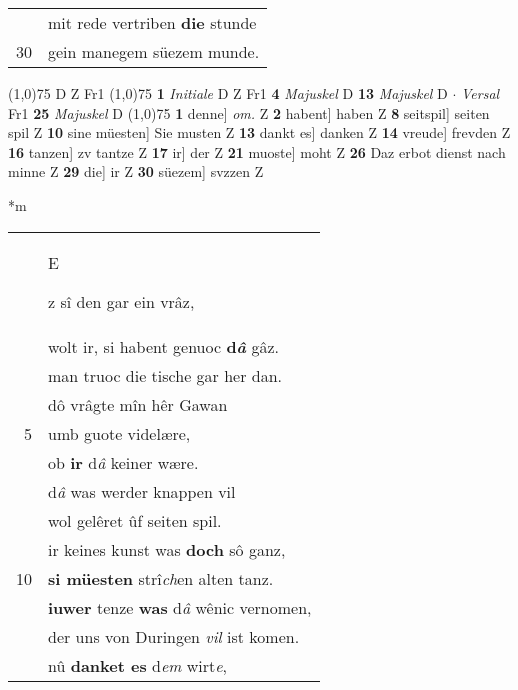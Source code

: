 \documentclass[8pt,a4paper,notitlepage]{article}
\begin{document}
\begin{table}[ht]
\begin{minipage}[t]{0.5\linewidth}
\begin{tabular}{rl}
 & mit rede vertriben \textbf{die} stunde\\ 
30 & gein manegem süezem munde.\\ 
\end{tabular}
\scriptsize
\line(1,0){75} \newline
D Z Fr1 \newline
\line(1,0){75} \newline
\textbf{1} \textit{Initiale} D Z Fr1  \textbf{4} \textit{Majuskel} D  \textbf{13} \textit{Majuskel} D   $\cdot$ \textit{Versal} Fr1  \textbf{25} \textit{Majuskel} D  \newline
\line(1,0){75} \newline
\textbf{1} denne] \textit{om.} Z \textbf{2} habent] haben Z \textbf{8} seitspil] seiten spil Z \textbf{10} sine müesten] Sie musten Z \textbf{13} dankt es] danken Z \textbf{14} vreude] frevden Z \textbf{16} tanzen] zv tantze Z \textbf{17} ir] der Z \textbf{21} muoste] moht Z \textbf{26} Daz erbot dienst nach minne Z \textbf{29} die] ir Z \textbf{30} süezem] svzzen Z \newline
\end{minipage}
\hspace{0.5cm}
\begin{minipage}[t]{0.5\linewidth}
\small
\begin{center}*m
\end{center}
\begin{tabular}{rl}
 & \begin{large}E\end{large}z sî den gar ein vrâz,\\ 
 & wolt ir, si habent genuoc \textbf{d\textit{â}} gâz.\\ 
 & man truoc die tische gar her dan.\\ 
 & dô vrâgte mîn hêr Gawan\\ 
5 & umb guote videlære,\\ 
 & ob \textbf{ir} d\textit{â} keiner wære.\\ 
 & d\textit{â} was werder knappen vil\\ 
 & wol gelêret ûf seiten spil.\\ 
 & ir keines kunst was \textbf{doch} sô ganz,\\ 
10 & \textbf{si müesten} strî\textit{ch}en alten tanz.\\ 
 & \textbf{iuwer} tenze \textbf{was} d\textit{â} wênic vernomen,\\ 
 & der uns von Duringen \textit{vil} ist komen.\\ 
 & nû \textbf{danket es} d\textit{em} wirt\textit{e},\\ 

\end{tabular}
\end{minipage}
\end{table}
\end{document}
